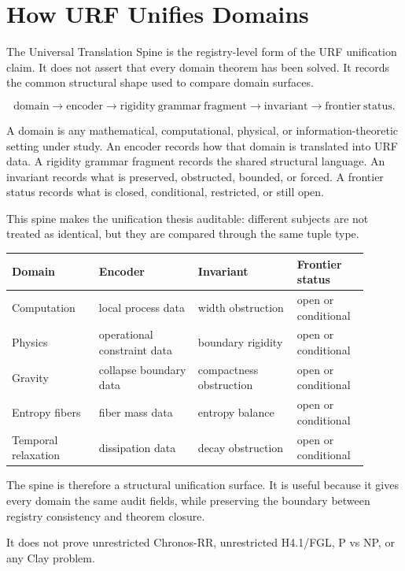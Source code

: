 \section{How URF Unifies Domains}
\label{sec:universal-translation-spine-v1}

The Universal Translation Spine is the registry-level form of the URF unification claim. It does not assert that every domain theorem has been solved. It records the common structural shape used to compare domain surfaces.

\[
\mathrm{domain}
\longrightarrow
\mathrm{encoder}
\longrightarrow
\mathrm{rigidity\ grammar\ fragment}
\longrightarrow
\mathrm{invariant}
\longrightarrow
\mathrm{frontier\ status}.
\]

A domain is any mathematical, computational, physical, or information-theoretic setting under study. An encoder records how that domain is translated into URF data. A rigidity grammar fragment records the shared structural language. An invariant records what is preserved, obstructed, bounded, or forced. A frontier status records what is closed, conditional, restricted, or still open.

This spine makes the unification thesis auditable: different subjects are not treated as identical, but they are compared through the same tuple type.

\begin{center}
\begin{tabular}{p{0.22\linewidth}p{0.25\linewidth}p{0.25\linewidth}p{0.18\linewidth}}
\toprule
Domain & Encoder & Invariant & Frontier status \\
\midrule
Computation & local process data & width obstruction & open or conditional \\
Physics & operational constraint data & boundary rigidity & open or conditional \\
Gravity & collapse boundary data & compactness obstruction & open or conditional \\
Entropy fibers & fiber mass data & entropy balance & open or conditional \\
Temporal relaxation & dissipation data & decay obstruction & open or conditional \\
\bottomrule
\end{tabular}
\end{center}

The spine is therefore a structural unification surface. It is useful because it gives every domain the same audit fields, while preserving the boundary between registry consistency and theorem closure.

It does not prove unrestricted Chronos-RR, unrestricted H4.1/FGL, P vs NP, or any Clay problem.
